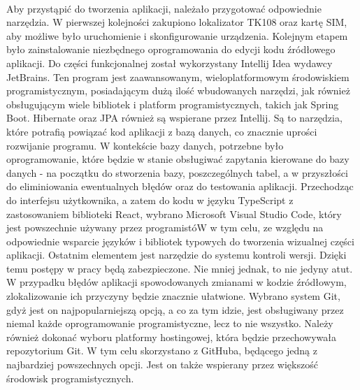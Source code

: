 \paragraph{}
Aby przystąpić do tworzenia aplikacji, należało przygotować odpowiednie narzędzia. W pierwszej kolejności zakupiono lokalizator TK108 oraz kartę SIM, aby możliwe było uruchomienie i skonfigurowanie urządzenia. Kolejnym etapem było zainstalowanie niezbędnego oprogramowania do edycji kodu źródłowego aplikacji. Do części funkcjonalnej został wykorzystany Intellij Idea wydawcy JetBrains. Ten program jest zaawansowanym, wieloplatformowym środowiskiem programistycznym, posiadającym dużą ilość wbudowanych narzędzi, jak również obsługującym wiele bibliotek i platform programistycznych, takich jak Spring Boot. Hibernate oraz JPA również są wspierane przez Intellij. Są to narzędzia, które potrafią powiązać kod aplikacji z bazą danych, co znacznie uprości rozwijanie programu. W kontekście bazy danych, potrzebne było oprogramowanie, które będzie w stanie obsługiwać zapytania kierowane do bazy danych - na początku do stworzenia bazy, poszczególnych tabel, a w przyszłości do eliminiowania ewentualnych błędów oraz do testowania aplikacji. Przechodząc do interfejsu użytkownika, a zatem do kodu w języku TypeScript z zastosowaniem biblioteki React, wybrano Microsoft Visual Studio Code, który jest powszechnie używany przez programistóW w tym celu, ze względu na odpowiednie wsparcie języków i bibliotek typowych do tworzenia wizualnej części aplikacji. Ostatnim elementem jest narzędzie do systemu kontroli wersji. Dzięki temu postępy w pracy będą zabezpieczone. Nie mniej jednak, to nie jedyny atut. W przypadku błędów aplikacji spowodowanych zmianami w kodzie źródłowym, zlokalizowanie ich przyczyny będzie znacznie ułatwione. Wybrano system Git, gdyż jest on najpopularniejszą opcją, a co za tym idzie, jest obsługiwany przez niemal każde oprogramowanie programistyczne, lecz to nie wszystko. Należy również dokonać wyboru platformy hostingowej, która będzie przechowywała repozytorium Git. W tym celu skorzystano z GitHuba, będącego jedną z najbardziej powszechnych opcji. Jest on także wspierany przez większość środowisk programistycznych. 

